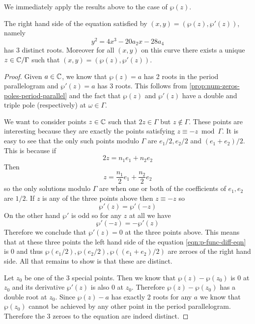 We immediately apply the results above to the case of $\wp(z)$.
\begin{theorem}\label{thm:wp-parametrises-ellptc-curve}
The right hand side of the equation satisfied by $(x, y) = (\wp(z), \wp'(z))$, namely 
\begin{equation}\label{eqn:p-func-diff-eqn}
    y^2 = 4x^3 - 20a_2x - 28a_4
\end{equation}
has 3 distinct roots. Moreover for all $(x, y)$ on this curve there exists a unique $z \in \mathbb{C}/\Gamma$ such that $(x, y) = (\wp(z), \wp'(z))$.
\end{theorem}
\begin{proof}
    Given $a \in \mathbb{C}$, we know that $\wp(z) = a$ has 2 roots in the period parallelogram and $\wp'(z) = a$ has 3 roots. This follows from \autoref{prop:num-zeros-poles-period-parallel} and the fact that $\wp(z)$ and $\wp'(z)$ have a double and triple pole (respectively) at $\omega \in \Gamma$. 

    We want to consider points $z \in \mathbb{C}$ such that $2z \in \Gamma$ but $z \notin \Gamma$. These points are interesting because they are exactly the points satisfying $z \equiv -z \bmod \Gamma$. It is easy to see that the only such points modulo $\Gamma$ are $e_1/2, e_2/2$ and $(e_1 + e_2)/2$. This is because if 
    $$2z = n_1 e_1 + n_2 e_2$$
    Then 
    $$z = \frac{n_1}{2}e_1 + \frac{n_2}{2}e_2$$
    so the only solutions modulo $\Gamma$ are when one or both of the coefficients of $e_1, e_2$ are $1/2$. If $z$ is any of the three points above then $z \equiv -z$ so
    $$\wp'(z) = \wp'(-z)$$
    On the other hand $\wp'$ is odd so for any $z$ at all we have
    $$\wp'(-z) = -\wp'(z)$$
    Therefore we conclude that $\wp'(z) = 0$ at the three points above. This means that at these three points the left hand side of the equation \eqref{eqn:p-func-diff-eqn} is 0 and thus $\wp(e_1/2), \wp(e_2/2), \wp((e_1 + e_2)/2)$ are zeroes of the right hand side. All that remains to show is that these are distinct. 

    Let $z_0$ be one of the 3 special points. Then we know that $\wp(z) - \wp(z_0)$ is 0 at $z_0$ and its derivative $\wp'(z)$ is also 0 at $z_0$. Therefore $\wp(z) - \wp(z_0)$ has a double root at $z_0$. Since $\wp(z) - a$ has exactly 2 roots for any $a$ we know that $\wp(z_0)$ cannot be achieved by any other point in the period parallelogram. Therefore the 3 zeroes to the equation are indeed distinct.


\end{proof}
